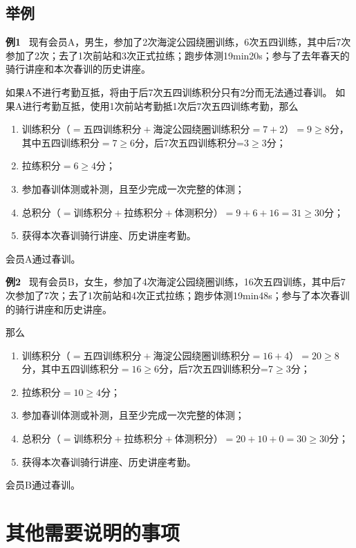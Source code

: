 \documentclass[UTF8]{ctexart}
\begin{document}
\subsection{举例}
\small{
    \textbf{例1} \ 现有会员A，男生，参加了2次海淀公园绕圈训练，6次五四训练，其中后7次参加了2次；去了1次前站和3次正式拉练；跑步体测19min20s；参与了去年春天的骑行讲座和本次春训的历史讲座。

如果A不进行考勤互抵，将由于后7次五四训练积分只有2分而无法通过春训。
如果A进行考勤互抵，使用1次前站考勤抵1次后7次五四训练考勤，那么
\begin{enumerate}[nosep,left=4em]
    \item 训练积分（$=\text{五四训练积分}+\text{海淀公园绕圈训练积分}=7+2$）$=9\ge 8$分，其中五四训练积分$=7\ge 6$分，后7次五四训练积分=3$\ge 3$分；
    \item 拉练积分$=6\ge 4$分；
    \item 参加春训体测或补测，且至少完成一次完整的体测；
    \item 总积分（$=\text{训练积分}+\text{拉练积分}+\text{体测积分}$）$=9+6+16=31\ge 30$分；
    \item 获得本次春训骑行讲座、历史讲座考勤。
\end{enumerate}

会员A通过春训。\\
}

\small{
    \textbf{例2} \ 现有会员B，女生，参加了4次海淀公园绕圈训练，16次五四训练，其中后7次参加了7次；去了1次前站和4次正式拉练；跑步体测19min48s；参与了本次春训的骑行讲座和历史讲座。

那么
\begin{enumerate}[nosep,left=4em]
    \item 训练积分（$=\text{五四训练积分}+\text{海淀公园绕圈训练积分}=16+4$）$=20\ge 8$分，其中五四训练积分$=16\ge 6$分，后7次五四训练积分=7$\ge 3$分；
    \item 拉练积分$=10\ge 4$分；
    \item 参加春训体测或补测，且至少完成一次完整的体测；
    \item 总积分（$=\text{训练积分}+\text{拉练积分}+\text{体测积分}$）$=20+10+0=30\ge 30$分；
    \item 获得本次春训骑行讲座、历史讲座考勤。
\end{enumerate}

会员B通过春训。

}



\section{其他需要说明的事项}
\end{document}
